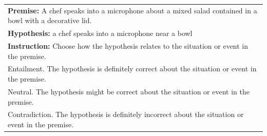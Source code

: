 \begin{tabular}{@{}p{\linewidth}@{}}
\toprule
\textbf{Premise:} A chef speaks into a microphone about a mixed salad contained in a bowl with a decorative lid. \\
\textbf{Hypothesis:} a chef speaks into a microphone near a bowl \\
\textbf{Instruction:} Choose how the hypothesis relates to the situation or event in the premise. \\
\midrule
Entailment. The hypothesis is definitely correct about the situation or event in the premise. \\
Neutral. The hypothesis might be correct about the situation or event in the premise. \\
Contradiction. The hypothesis is definitely incorrect about the situation or event in the premise. \\
\bottomrule
\end{tabular}
